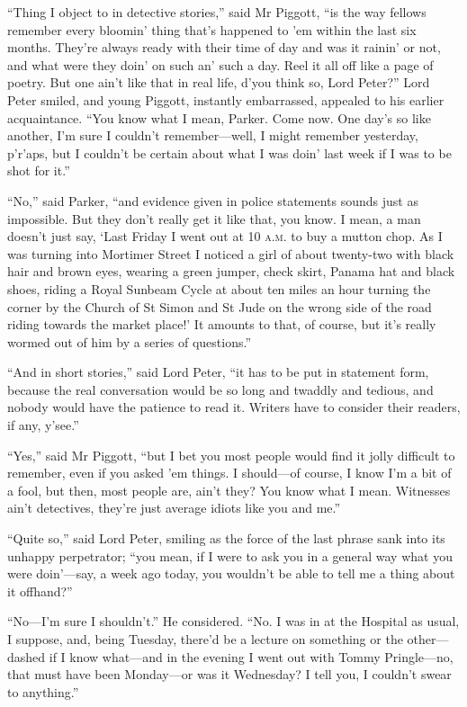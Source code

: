 \enquote{Thing I object to in detective stories,} said Mr Piggott, \enquote{is the way fellows remember every bloomin’ thing that’s happened to ’em within the last six months. They’re always ready with their time of day and was it rainin’ or not, and what were they doin’ on such an’ such a day. Reel it all off like a page of poetry. But one ain’t like that in real life, d’you think so, Lord Peter?} Lord Peter smiled, and young Piggott, instantly embarrassed, appealed to his earlier acquaintance. \enquote{You know what I mean, Parker. Come now. One day’s so like another, I’m sure I couldn’t remember\allowbreak---\allowbreak well, I might remember yesterday, p’r’aps, but I couldn’t be certain about what I was doin’ last week if I was to be shot for it.}

\enquote{No,} said Parker, \enquote{and evidence given in police statements sounds just as impossible. But they don’t really get it like that, you know. I mean, a man doesn’t just say, \enquote{Last Friday I went out at 10 \textsc{a.m.} to buy a mutton chop. As I was turning into Mortimer Street I noticed a girl of about twenty-two with black hair and brown eyes, wearing a green jumper, check skirt, Panama hat and black shoes, riding a Royal Sunbeam Cycle at about ten miles an hour turning the corner by the Church of St Simon and St Jude on the wrong side of the road riding towards the market place!} It amounts to that, of course, but it’s really wormed out of him by a series of questions.}

\enquote{And in short stories,} said Lord Peter, \enquote{it has to be put in statement form, because the real conversation would be so long and twaddly and tedious, and nobody would have the patience to read it. Writers have to consider their readers, if any, y’see.}

\enquote{Yes,} said Mr Piggott, \enquote{but I bet you most people would find it jolly difficult to remember, even if you asked ’em things. I should\allowbreak---\allowbreak of course, I know I’m a bit of a fool, but then, most people are, ain’t they? You know what I mean. Witnesses ain’t detectives, they’re just average idiots like you and me.}

\enquote{Quite so,} said Lord Peter, smiling as the force of the last phrase sank into its unhappy perpetrator; \enquote{you mean, if I were to ask you in a general way what you were doin’---say, a week ago today, you wouldn’t be able to tell me a thing about it offhand?}

\enquote{No\allowbreak---\allowbreak I’m sure I shouldn’t.} He considered. \enquote{No. I was in at the Hospital as usual, I suppose, and, being Tuesday, there’d be a lecture on something or the other\allowbreak---\allowbreak dashed if I know what\allowbreak---\allowbreak and in the evening I went out with Tommy Pringle\allowbreak---\allowbreak no, that must have been Monday\allowbreak---\allowbreak or was it Wednesday? I tell you, I couldn’t swear to anything.}

